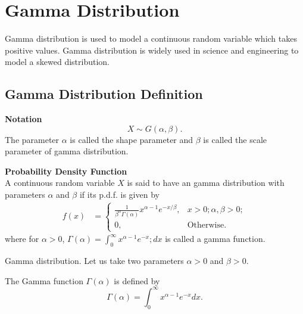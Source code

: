 \documentclass[a4paper,12pt]{article}
\begin{document}
\large
\section*{Gamma Distribution}
Gamma distribution is used to model a continuous random variable which takes positive values. Gamma distribution is widely used in science and engineering to model a skewed distribution.

\subsection*{Gamma Distribution Definition}

\noindent \textbf{Notation} \[X\sim G(\alpha, \beta).\]The parameter $\alpha$ is called the shape parameter and $\beta$ is called the scale parameter of gamma distribution.

\noindent \textbf{Probability Density Function}\\
A continuous random variable $X$ is said to have an gamma distribution with parameters $\alpha$ and $\beta$ if its p.d.f. is given by\[ \begin{align*} f(x)&= \begin{cases} \frac{1}{\beta^\alpha\Gamma(\alpha)}x^{\alpha -1}e^{-x/\beta}, & x > 0;\alpha, \beta > 0; \\ 0, & \mbox{Otherwise.} \end{cases} \end{align*} \]where for $\alpha>0$, $\Gamma(\alpha)=\int_0^\infty x^{\alpha-1}e^{-x}; dx$ is called a gamma function.




\newpage


Gamma distribution. Let us take two parameters $\alpha > 0$ and $\beta > 0$. 

The Gamma function
$\Gamma(\alpha)$ is defined by
\[\Gamma(\alpha) = \int^{\infty}_{0}x^{\alpha−1}e^{−x}dx.\]
\end{document}
